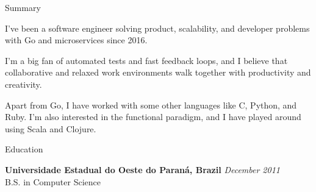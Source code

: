 \documentclass[
	a4paper, %
	10pt, %
]{resume} %
\begin{document}

\begin{rSection}{Summary}

I've been a software engineer solving product, scalability, and developer problems with Go and microservices since 2016.

I'm a big fan of automated tests and fast feedback loops, and I believe that collaborative and relaxed work environments walk together with productivity and creativity.

Apart from Go, I have worked with some other languages like C, Python, and Ruby.
I'm also interested in the functional paradigm, and I have played around using Scala and Clojure.

\end{rSection}


\begin{rSection}{Education}

	\textbf{Universidade Estadual do Oeste do Paraná, Brazil} \hfill \textit{December 2011} \\
	B.S. in Computer Science

\end{rSection}


\end{document}

